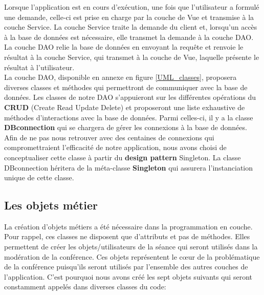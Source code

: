 \documentclass[11pt]{article}
\begin{document}
Lorsque l'application est en cours d'exécution, une fois que l'utilisateur a formulé une demande, celle-ci est prise en charge par la couche de Vue et transmise à la couche Service. La couche Service traite la demande du client et, lorsqu'un accès à la base de données est nécessaire, elle transmet la demande à la couche DAO. La couche DAO relie la base de données en envoyant la requête et renvoie le résultat à la couche Service, qui transmet à la couche de Vue, laquelle présente le résultat à l'utilisateur.\\

La couche DAO, disponible en annexe en figure \ref{UML_classes}, proposera diverses classes et méthodes qui permettront de communiquer avec la base de données. Les classes de notre DAO s'appuieront sur les différentes opérations du \textbf{CRUD} (Create Read Update Delete) et proposeront une liste exhaustive de méthodes d'interactions avec la base de données. Parmi celles-ci, il y a la classe \textbf{DBconnection} qui se chargera de gérer les connexions à la base de données. Afin de ne pas nous retrouver avec des centaines de connexions qui compromettraient l'efficacité de notre application, nous avons choisi de conceptualiser cette classe à partir du \textbf{design pattern} Singleton. La classe DBconnection héritera de la méta-classe \textbf{Singleton} qui assurera l'instanciation unique de cette classe.



\subsection{Les objets métier}

La création d’objets métiers a été nécessaire dans la programmation en couche. Pour rappel, ces classes ne disposent que d’attributs et pas de méthodes. Elles permettent de créer les objets/utilisateurs de la séance qui seront utilisés dans la modération de la conférence. Ces objets représentent le cœur de la problématique de la conférence puisqu’ils seront utilisés par l’ensemble des autres couches de l’application. C’est pourquoi nous avons créé les sept objets suivants qui seront constamment appelés dans diverses classes du code:

\bigbreak
\end{document}
